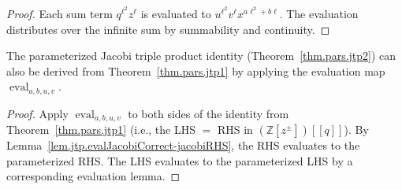 \begin{proof}
\leanok
Each sum term $q^{\ell^2}z^\ell$ is evaluated to $u^{\ell^2} v^\ell x^{a\ell^2+b\ell}$.
The evaluation distributes over the infinite sum by summability and continuity.
\end{proof}

\begin{theorem}
\label{thm.jtp.jacobi-via-evalCorrect}
\leanhelper
\leanok
The parameterized Jacobi triple product identity (Theorem~\ref{thm.pars.jtp2})
can also be derived from Theorem~\ref{thm.pars.jtp1} by applying the
evaluation map $\operatorname{eval}_{a,b,u,v}$.
\end{theorem}

\begin{proof}
\leanok
Apply $\operatorname{eval}_{a,b,u,v}$ to both sides of
the identity from Theorem~\ref{thm.pars.jtp1} (i.e., the LHS $=$ RHS in
$(\mathbb{Z}[z^{\pm}])[[q]]$).
By Lemma~\ref{lem.jtp.evalJacobiCorrect-jacobiRHS}, the RHS evaluates to
the parameterized RHS. The LHS evaluates to the parameterized LHS
by a corresponding evaluation lemma.
\end{proof}
